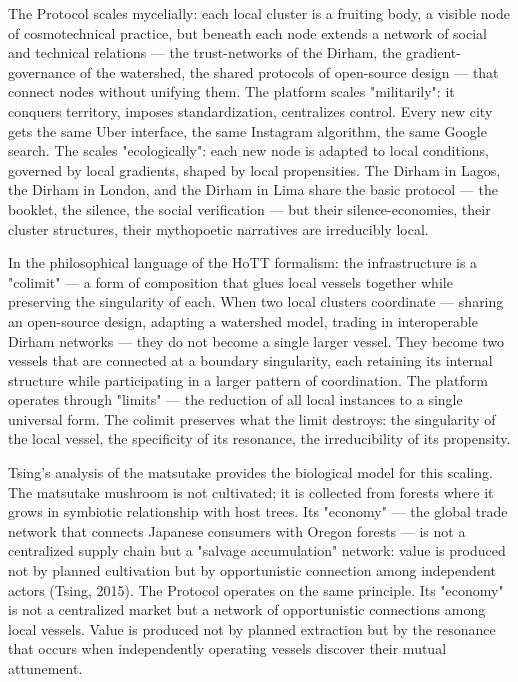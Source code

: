 The  Protocol scales mycelially: each local cluster is a fruiting body, a visible node of cosmotechnical practice, but beneath each node extends a network of social and technical relations — the trust-networks of the Dirham, the gradient-governance of the watershed, the shared protocols of open-source design — that connect nodes without unifying them. The platform scales "militarily": it conquers territory, imposes standardization, centralizes control. Every new city gets the same Uber interface, the same Instagram algorithm, the same Google search. The  scales "ecologically": each new node is adapted to local conditions, governed by local gradients, shaped by local propensities. The Dirham in Lagos, the Dirham in London, and the Dirham in Lima share the basic protocol — the booklet, the silence, the social verification — but their silence-economies, their cluster structures, their mythopoetic narratives are irreducibly local.

In the philosophical language of the HoTT formalism: the  infrastructure is a "colimit" — a form of composition that glues local vessels together while preserving the singularity of each. When two local  clusters coordinate — sharing an open-source design, adapting a watershed model, trading in interoperable Dirham networks — they do not become a single larger vessel. They become two vessels that are connected at a boundary singularity, each retaining its internal structure while participating in a larger pattern of coordination. The platform operates through "limits" — the reduction of all local instances to a single universal form. The colimit preserves what the limit destroys: the singularity of the local vessel, the specificity of its resonance, the irreducibility of its propensity.

Tsing's analysis of the matsutake provides the biological model for this scaling. The matsutake mushroom is not cultivated; it is collected from forests where it grows in symbiotic relationship with host trees. Its "economy" — the global trade network that connects Japanese consumers with Oregon forests — is not a centralized supply chain but a "salvage accumulation" network: value is produced not by planned cultivation but by opportunistic connection among independent actors (Tsing, 2015). The  Protocol operates on the same principle. Its "economy" is not a centralized market but a network of opportunistic connections among local vessels. Value is produced not by planned extraction but by the resonance that occurs when independently operating vessels discover their mutual attunement.

